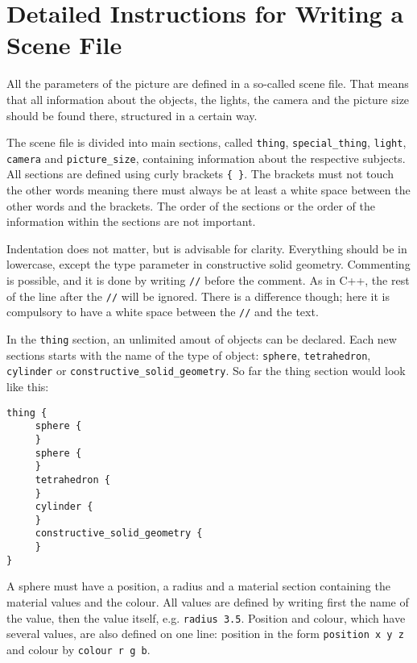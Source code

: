 
\section{Detailed Instructions for Writing a Scene File \label{a:scene} \label{fileReading}}

All the parameters of the picture are defined in a so-called scene file. That means that all information about the objects, the lights, the camera and the picture size should be found there, structured in a certain way.

The scene file is divided into main sections, called \texttt{thing}, \texttt{special\_thing}, \texttt{light}, \texttt{camera} and \texttt{picture\_size}, containing information about the respective subjects. All sections are defined using curly brackets \texttt{\{ \}}. The brackets must not touch the other words meaning there must always be at least a white space between the other words and the brackets. The order of the sections or the order of the information within the sections are not important.

Indentation does not matter, but is advisable for clarity. Everything should be in lowercase, except the type parameter in constructive solid geometry. Commenting is possible, and it is done by writing \texttt{//} before the comment. As in C++, the rest of the line after the \texttt{//} will be ignored. There is a difference though; here it is compulsory to have a white space between the \texttt{//} and the text. 

In the \texttt{thing} section, an unlimited amout of objects can be declared. Each new sections starts with the name of the type of object: \texttt{sphere}, \texttt{tetrahedron}, \texttt{cylinder} or \texttt{constructive\_solid\_geometry}. So far the thing section would look like this:

\begin{verbatim}
thing {
     sphere {
     }
     sphere {
     }
     tetrahedron {
     }
     cylinder {
     }
     constructive_solid_geometry {
     }
}
\end{verbatim}

A sphere must have a position, a radius and a material section containing the material values and the colour. All values are defined by writing first the name of the value, then the value itself, e.g. \texttt{radius 3.5}. Position and colour, which have several values, are also defined on one line: position in the form \texttt{position x y z} and colour by \texttt{colour r g b}.

